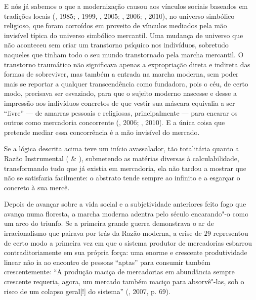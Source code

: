 E nós já sabemos o que a modernização causou aos vínculos sociais
baseados em tradições locais (, 1985; , 1999, , 2005;
, 2006; , 2010), no universo simbólico religioso, que foram
corroídos em proveito de vínculos mediados pela mão invisível típica do
universo simbólico mercantil. Uma mudança de universo que não aconteceu
sem criar um transtorno psíquico nos indivíduos, sobretudo naqueles que
tinham todo o seu mundo transtornado pela marcha mercantil. O transtorno
traumático não significava apenas a expropriação direta e indireta das
formas de sobreviver, mas também a entrada na marcha moderna, sem poder
mais se reportar a qualquer transcendência como fundadora, pois o céu,
de certo modo, precisava ser esvaziado, para que o sujeito moderno
nascesse e desse a impressão aos indivíduos concretos de que vestir sua
máscara equivalia a ser ``livre'' --- de amarras pessoais e religiosas,
principalmente --- para encarar os outros como mercadoria concorrente
(, 2006; , 2010). E a única coisa que pretende mediar essa
concorrência é a mão invisível do mercado.

Se a lógica descrita acima teve um início avassalador, tão totalitária
quanto a Razão Instrumental ( \& ), submetendo as
matérias diversas à calculabilidade, transformando
tudo que já existia em mercadoria, ela não tardou a mostrar que não se
satisfazia facilmente: o abstrato tende sempre ao infinito e a esgarçar
o concreto à sua mercê.

Depois de avançar sobre a vida social e a subjetividade anteriores feito
fogo que avança numa floresta, a marcha moderna adentra pelo século 
encarando"-o como um arco do triunfo. Se a primeira grande guerra
demonstrava o ar de irracionalismo que pairava por trás da Razão
moderna, a crise de 29 representou de certo modo a primeira vez em que o
sistema produtor de mercadorias esbarrou contraditoriamente em sua
própria força: uma enorme e crescente produtividade linear não ia ao
encontro de pessoas ``aptas'' para consumir também crescentemente: ``A
produção maciça de mercadorias em abundância sempre crescente requeria,
agora, um mercado também maciço para absorvê"-las, sob o risco de um
colapso geral[!] do sistema'' (, 2007, p. 69).

